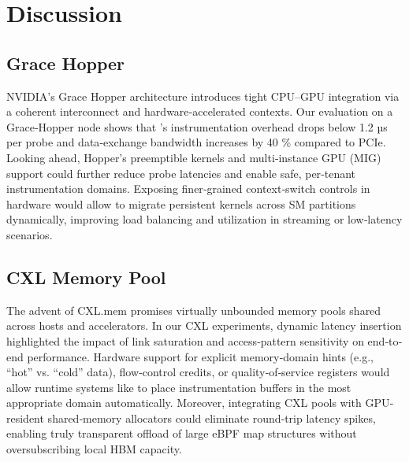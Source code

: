 \section{Discussion}\label{sec:suggestion}

\subsection{Grace Hopper}
NVIDIA’s Grace Hopper architecture introduces tight CPU–GPU integration via a coherent interconnect and hardware‐accelerated contexts. Our evaluation on a Grace‐Hopper node shows that \sys{}’s instrumentation overhead drops below 1.2 µs per probe and data‐exchange bandwidth increases by 40 \% compared to PCIe. Looking ahead, Hopper’s preemptible kernels and multi‐instance GPU (MIG) support could further reduce probe latencies and enable safe, per‐tenant instrumentation domains. Exposing finer‐grained context‐switch controls in hardware would allow \sys{} to migrate persistent kernels across SM partitions dynamically, improving load balancing and utilization in streaming or low‐latency scenarios.  

\subsection{CXL Memory Pool}
The advent of CXL.mem promises virtually unbounded memory pools shared across hosts and accelerators. In our CXL experiments, dynamic latency insertion highlighted the impact of link saturation and access‐pattern sensitivity on end‐to‐end performance. Hardware support for explicit memory‐domain hints (e.g., “hot” vs. “cold” data), flow‐control credits, or quality‐of‐service registers would allow runtime systems like \sys{} to place instrumentation buffers in the most appropriate domain automatically. Moreover, integrating CXL pools with GPU‐resident shared‐memory allocators could eliminate round‐trip latency spikes, enabling truly transparent offload of large eBPF map structures without oversubscribing local HBM capacity.

